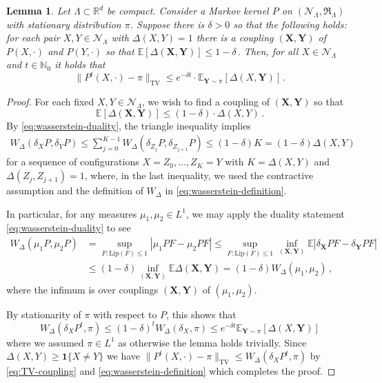\documentclass[10pt]{amsart}
\newtheorem{lemma}[theorem]{Lemma}
\theoremstyle{definition}
\theoremstyle{remark}
\newcommand{\pointsets}{\mathcal{N}}
\newcommand{\events}{\mathfrak{R}}
\newcommand{\one}{\boldsymbol{1}}
\newcommand{\bX}{\mathbf{X}}
\newcommand{\bY}{\mathbf{Y}}
\newcommand{\E}{\mathbb{E}}
\newcommand{\R}{\mathbb{R}}
\newcommand{\region}{\Lambda}
\begin{document}
	\begin{lemma} \label{lemma:path_coupling}
		Let $\region \subset \R^d$ be compact. 
		Consider a Markov kernel $P$ on $(\pointsets_{\Lambda},\events_{\region})$ with stationary distribution $\pi$.  Suppose there is $\delta > 0$ so that the following holds: for each pair $X,Y \in \pointsets_{\Lambda}$ with $\Delta(X,Y) = 1$ there is a coupling $(\bX,\bY)$ of $P(X,\cdot)$ and $P(Y,\cdot)$ so that $\E[\Delta(\bX,\bY)] \leq 1 - \delta\,. $
		Then, for all $X \in \pointsets_{\Lambda}$ and $t \in \mathbb{N}_0$ it holds that 
		\[
		\|P^t(X, \cdot) - \pi\|_{\mathrm{TV}} \le e^{- \delta t} \cdot \E_{\bY \sim \pi} [\Delta(X, \bY)] \,.
		\]
	\end{lemma}
	\begin{proof}
		For each fixed $X,Y \in \pointsets_{\Lambda}$, we wish to find a coupling of $(\bX,\bY)$ so that $$\E[\Delta(\bX,\bY)] \leq (1 - \delta) \cdot \Delta(X,Y)\,.$$
		By \eqref{eq:wasserstein-duality}, the triangle inequality implies \begin{align*}
			W_\Delta(\delta_XP,\delta_Y P) \leq \sum_{j = 0}^{K - 1} W_\Delta(\delta_{Z_j} P,\delta_{Z_{j+1}}P) \leq  (1 - \delta) K = (1 - \delta) \Delta(X, Y)
		\end{align*}
		for a sequence of configurations $X=Z_0, \dots, Z_K = Y$ with $K=\Delta(X, Y)$ and $\Delta(Z_j, Z_{j+1}) = 1$, where, in the last inequality, we used the contractive assumption and the definition of $W_\Delta$ in \eqref{eq:wasserstein-definition}.    
		
		In particular, for any measures $\mu_1,\mu_2 \in L^1$, we may apply the duality statement \eqref{eq:wasserstein-duality} to see 
		\begin{align*}
			W_{\Delta}(\mu_1 P,\mu_2 P) 
			&= \sup_{F : \mathrm{Lip}(F) \leq 1} | \mu_1 P F - \mu_2 P F| 
			\le  \sup_{F : \mathrm{Lip}(F) \leq 1} \inf_{(\bX, \bY)} \E |\delta_{\bX} P F - \delta_{\bY} P F| \\ 
			&\le (1-\delta) \inf_{(\bX, \bY)} \E \Delta(\bX, \bY) = (1 - \delta) W_{\Delta}(\mu_1, \mu_2) \,,
		\end{align*}
		where the infimum is over couplings $(\bX,\bY)$ of $(\mu_1,\mu_2)$.
		
		
		
		
		By stationarity of $\pi$ with respect to $P$, this shows that $$W_\Delta(\delta_X P^t,\pi) \leq (1 - \delta)^t W_{\Delta}(\delta_X,\pi) \leq e^{-\delta t} \E_{\bY \sim \pi}[\Delta(X,\bY)]$$ where we assumed $\pi \in L^1$ as otherwise the lemma holds trivially.
		Since $\Delta(X,Y) \geq \one\{X \neq Y\}$ we have $\|P^t(X,\cdot) - \pi\|_{\mathrm{TV}} \leq W_\Delta(\delta_X P^t,\pi)$ by \eqref{eq:TV-coupling}  and \eqref{eq:wasserstein-definition} which completes the proof.   
	\end{proof}
	
\end{document}
